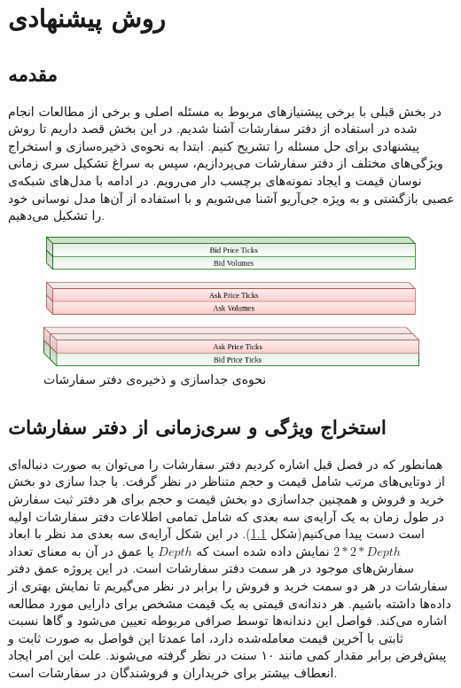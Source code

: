 \chapter{روش پیشنهادی}

\section{مقدمه}
در بخش قبلی با برخی پیشنیاز‌های مربوط به مسئله اصلی و برخی از مطالعات انجام شده در استفاده از دفتر سفارشات آشنا شدیم. در این بخش قصد داریم تا روش پیشنهادی برای حل مسئله را تشریح کنیم. ابتدا به نحوه‌ی ذخیره‌سازی و استخراج ویژگی‌های مختلف از دفتر سفارشات می‌پردازیم، سپس به سراغ تشکیل سری زمانی نوسان قیمت و ایجاد نمونه‌های برچسب دار می‌رویم. در ادامه با مدل‌های شبکه‌ی عصبی بازگشتی و به ویژه جی‌آریو آشنا می‌شویم و با استفاده از آن‌ها مدل نوسانی خود را تشکیل می‌دهیم.

\begin{figure}[!t]
	\includegraphics[width=1.0 \textwidth]{images/orderbook_structure}
	\centering
	\caption{نحوه‌ی جداسازی و ذخیره‌ی دفتر سفارشات	}
	\label{fig.orderbook_structure}
\end{figure}

\section{استخراج ویژگی و سری‌زمانی از دفتر سفارشات}
همانطور که در فصل قبل اشاره کردیم دفتر سفارشات را می‌توان به صورت دنباله‌ای از دوتایی‌های مرتب شامل قیمت و حجم متناظر در نظر گرفت. با جدا سازی دو بخش خرید و فروش و همچنین جداسازی دو بخش قیمت و حجم برای هر دفتر ثبت سفارش در طول زمان به یک آرایه‌ی سه بعدی که شامل تمامی اطلاعات دفتر سفارشات اولیه است دست پیدا می‌کنیم(شکل \ref{fig.orderbook_structure}). در این شکل آرایه‌ی سه بعدی مد نظر با ابعاد $2 * 2 * Depth$ نمایش داده شده است که $Depth$ یا عمق در آن به معنای تعداد سفارش‌های موجود در هر سمت دفتر سفارشات است. در این پروژه عمق دفتر سفارشات در هر دو سمت خرید و فروش را برابر در نظر می‌گیریم تا نمایش بهتری از داده‌ها داشته باشیم. هر دندانه‌ی قیمتی به یک قیمت مشخص برای دارایی مورد مطالعه اشاره می‌کند. فواصل این دندانه‌ها توسط صرافی مربوطه تعیین می‌شود و گاها نسبت ثابتی با آخرین قیمت معامله‌شده دارد، اما عمدتا این فواصل به صورت ثابت و پیش‌فرض برابر مقدار کمی مانند ۱۰ سنت در نظر گرفته می‌شوند. علت این امر ایجاد انعطاف بیشتر برای خریداران و فروشندگان در سفارشات است. 

